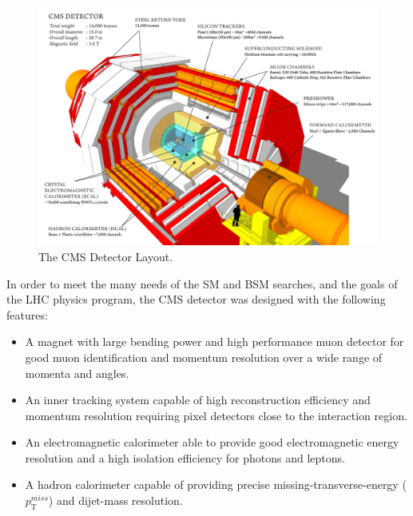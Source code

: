 \begin{figure}[tb]
\includegraphics[width=1.0\textwidth]{CMSLayout.png} 
\caption{The CMS Detector Layout\cite{CMSlayout}.}
\label{CMSLayout} 
\hspace{4em}
\end{figure}

In order to meet the many needs of the SM and BSM searches, and the goals of the LHC physics program, the CMS detector was designed with the following features:\\
\begin{itemize}
	\itemsep-1em
	\item{A magnet with large bending power and high performance muon detector for good muon identification and momentum resolution over a wide range of momenta and angles.}\\
	\item{An inner tracking system capable of high reconstruction efficiency and momentum resolution requiring pixel detectors close to the interaction region.}\\
	\item{An electromagnetic calorimeter able to provide good electromagnetic energy resolution and a high isolation efficiency for photons and leptons.}\\
	\item{A hadron calorimeter capable of providing precise missing-transverse-energy ($p_\text{T}^{miss}$)  and dijet-mass resolution.}\\
\end{itemize}

